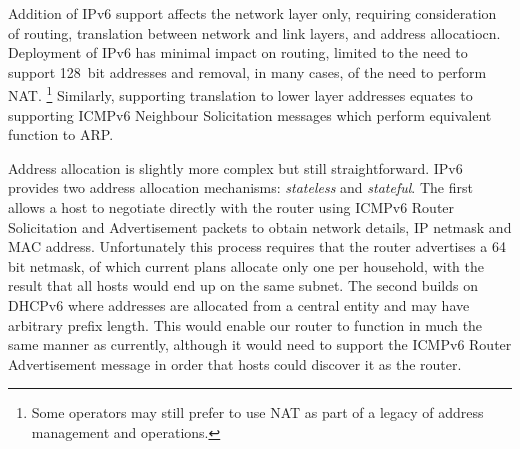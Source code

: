 Addition of IPv6 support affects the network layer only, requiring consideration
of routing, translation between network and link layers, and address
allocatiocn.  Deployment of IPv6 has minimal impact on routing, limited to the
need to support 128~bit addresses and removal, in many cases, of the need to
perform NAT.
\footnote{Some operators may still prefer to use NAT as part of a legacy of
address management and operations.}  
Similarly, supporting translation to lower layer addresses equates to supporting
ICMPv6 Neighbour Solicitation messages which perform equivalent function to ARP.


Address allocation is slightly more complex but still straightforward.  IPv6
provides two address allocation mechanisms: \emph{stateless} and
\emph{stateful}.  The first allows a host to negotiate directly with the router
using ICMPv6 Router Solicitation and Advertisement packets to obtain network
details, IP netmask and MAC address.  Unfortunately this process requires that
the router advertises a 64 bit netmask, of which current plans allocate only one
per household, with the result that all hosts would end up on the same subnet.
The second builds on DHCPv6 where addresses are allocated from a central entity
and may have arbitrary prefix length.  This would enable our router to function
in much the same manner as currently, although it would need to support the
ICMPv6 Router Advertisement message in order that hosts could discover it as the
router. 

